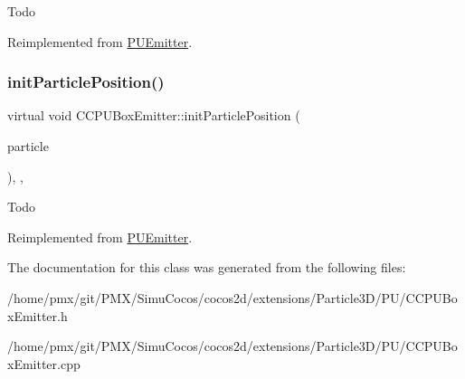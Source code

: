 Todo 

Reimplemented from \hyperlink{classPUEmitter_a2449f31b73c94a55f6559be71d56ca61}{P\+U\+Emitter}.

\mbox{\label{classCCPUBoxEmitter_a405d3a333bd6e513a38f1b318163f969}} 
\subsubsection{\texorpdfstring{init\+Particle\+Position()}{initParticlePosition()}\hspace{0.1cm}{\footnotesize\ttfamily [2/2]}}
{\footnotesize\ttfamily virtual void C\+C\+P\+U\+Box\+Emitter\+::init\+Particle\+Position (\begin{DoxyParamCaption}\item[{\hyperlink{structPUParticle3D}{P\+U\+Particle3D} $\ast$}]{particle }\end{DoxyParamCaption})\hspace{0.3cm}{\ttfamily [override]}, {\ttfamily [protected]}, {\ttfamily [virtual]}}

Todo 

Reimplemented from \hyperlink{classPUEmitter_a2449f31b73c94a55f6559be71d56ca61}{P\+U\+Emitter}.



The documentation for this class was generated from the following files\+:\begin{DoxyCompactItemize}
\item 
/home/pmx/git/\+P\+M\+X/\+Simu\+Cocos/cocos2d/extensions/\+Particle3\+D/\+P\+U/C\+C\+P\+U\+Box\+Emitter.\+h\item 
/home/pmx/git/\+P\+M\+X/\+Simu\+Cocos/cocos2d/extensions/\+Particle3\+D/\+P\+U/C\+C\+P\+U\+Box\+Emitter.\+cpp\end{DoxyCompactItemize}
